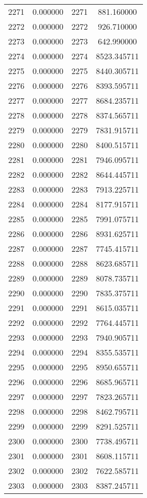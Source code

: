 \documentclass[12pt]{article}
\begin{document}
\begin{longtable}{@{}cccc@{}}
2271 & 0.000000 & 2271 & 881.160000 \\
2272 & 0.000000 & 2272 & 926.710000 \\
2273 & 0.000000 & 2273 & 642.990000 \\
2274 & 0.000000 & 2274 & 8523.345711 \\
2275 & 0.000000 & 2275 & 8440.305711 \\
2276 & 0.000000 & 2276 & 8393.595711 \\
2277 & 0.000000 & 2277 & 8684.235711 \\
2278 & 0.000000 & 2278 & 8374.565711 \\
2279 & 0.000000 & 2279 & 7831.915711 \\
2280 & 0.000000 & 2280 & 8400.515711 \\
2281 & 0.000000 & 2281 & 7946.095711 \\
2282 & 0.000000 & 2282 & 8644.445711 \\
2283 & 0.000000 & 2283 & 7913.225711 \\
2284 & 0.000000 & 2284 & 8177.915711 \\
2285 & 0.000000 & 2285 & 7991.075711 \\
2286 & 0.000000 & 2286 & 8931.625711 \\
2287 & 0.000000 & 2287 & 7745.415711 \\
2288 & 0.000000 & 2288 & 8623.685711 \\
2289 & 0.000000 & 2289 & 8078.735711 \\
2290 & 0.000000 & 2290 & 7835.375711 \\
2291 & 0.000000 & 2291 & 8615.035711 \\
2292 & 0.000000 & 2292 & 7764.445711 \\
2293 & 0.000000 & 2293 & 7940.905711 \\
2294 & 0.000000 & 2294 & 8355.535711 \\
2295 & 0.000000 & 2295 & 8950.655711 \\
2296 & 0.000000 & 2296 & 8685.965711 \\
2297 & 0.000000 & 2297 & 7823.265711 \\
2298 & 0.000000 & 2298 & 8462.795711 \\
2299 & 0.000000 & 2299 & 8291.525711 \\
2300 & 0.000000 & 2300 & 7738.495711 \\
2301 & 0.000000 & 2301 & 8608.115711 \\
2302 & 0.000000 & 2302 & 7622.585711 \\
2303 & 0.000000 & 2303 & 8387.245711 \\

\end{longtable}
\end{document}
